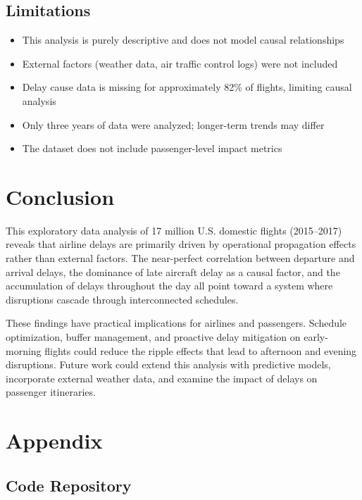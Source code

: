\documentclass[12pt,a4paper]{article}
\begin{document}
\subsection{Limitations}

\begin{itemize}
    \item This analysis is purely descriptive and does not model causal relationships
    \item External factors (weather data, air traffic control logs) were not included
    \item Delay cause data is missing for approximately 82\% of flights, limiting causal analysis
    \item Only three years of data were analyzed; longer-term trends may differ
    \item The dataset does not include passenger-level impact metrics
\end{itemize}

\section{Conclusion}

This exploratory data analysis of 17 million U.S. domestic flights (2015--2017) reveals that airline delays are primarily driven by operational propagation effects rather than external factors. The near-perfect correlation between departure and arrival delays, the dominance of late aircraft delay as a causal factor, and the accumulation of delays throughout the day all point toward a system where disruptions cascade through interconnected schedules.

These findings have practical implications for airlines and passengers. Schedule optimization, buffer management, and proactive delay mitigation on early-morning flights could reduce the ripple effects that lead to afternoon and evening disruptions. Future work could extend this analysis with predictive models, incorporate external weather data, and examine the impact of delays on passenger itineraries.

\appendix
\section{Appendix}

\subsection{Code Repository}
\end{document}
